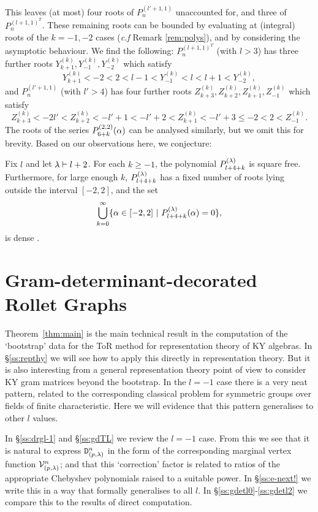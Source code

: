 This leaves (at most) four roots of $P^{(l'+1,1)}_{n}$ unaccounted for, and three of $P^{(l+1,1)^T}_{n}$. These remaining roots can be bounded by evaluating at (integral) roots of the $k=-1,-2$ cases (\textit{c.f} Remark \ref{rem:polys}), and by considering the asymptotic behaviour. We find the following: $P^{(l+1,1)^T}_{n}$ (with $l>3$) has three further roots $Y_{k+1}^{(k)},Y_{-1}^{(k)},Y_{-2}^{(k)}$ which satisfy
\[Y_{k+1}^{(k)}<-2<2<l-1<Y_{-1}^{(k)}<l<l+1<Y_{-2}^{(k)},\]
and $P^{(l'+1,1)}_{n}$ (with $l'>4$) has four further roots $Z_{k+3}^{(k)},Z_{k+2}^{(k)},Z_{k+1}^{(k)},Z_{-1}^{(k)}$ which satisfy
\[Z_{k+3}^{(k)}<-2l'< Z_{k+2}^{(k)}<-l'+1<-l'+2<Z_{k+1}^{(k)}<-l'+3\leq -2<2<Z_{-1}^{(k)}.\]
The roots of the series $P^{(2,2)}_{6+k}(\alpha)$ can be analysed similarly, but we omit this for brevity. Based on our observations here, we conjecture:

\begin{conjecture} Fix $l$ and let $\lambda \vdash l+2$. For each $k\geq -1$, the polynomial $P^{(\lambda)}_{l+4+k}$ is square free. Furthermore, for large enough $k$, $P^{(\lambda)}_{l+4+k}$ has a fixed number of roots lying outside the interval $[-2,2]$, and the set
\[\bigcup_{k=0}^{\infty } \{\alpha \in [-2,2] \ | \ P^{(\lambda)}_{l+4+k}(\alpha)=0  \},\]
    is dense .
\end{conjecture}


\section{Gram-determinant-decorated Rollet Graphs}   \label{ss:gdetdecrollet}

Theorem~\ref{thm:main} is the main technical result in the computation of the `bootstrap' data 
for the ToR method for representation theory of KY algebras. 
In \S\ref{ss:repthy} we will see how to apply this directly in representation theory. 
But it is also interesting from a general representation theory point of view to consider KY gram matrices beyond the bootstrap. In the $l=-1$ case there is a very neat pattern, related to the corresponding classical problem for symmetric groups over fields of finite characteristic. 
Here we will evidence that this pattern generalises to other $l$ values. 

In \S\ref{ss:drgl-1} and \S\ref{ss:gdTL} we review the $l=-1$ case. 
From this we see that it is natural to express ${\mathtt D}^{n}_{(p,\lambda)}$ in the form of the corresponding marginal vertex function ${\mathcal V}^n_{(p,\lambda)}$; and that this `correction' factor is related to ratios of the appropriate Chebyshev polynomials raised to a suitable power. 
In \S\ref{ss:e-next!} we  write this in a way that 
formally generalises to all $l$. 
In \S\ref{ss:gdetl0}-\ref{ss:gdetl2} we compare this to the results of direct computation. 



